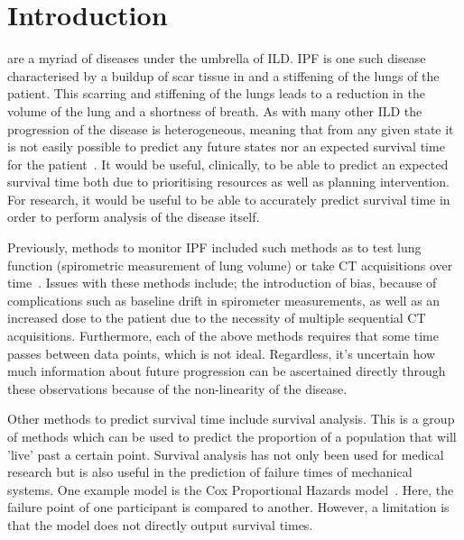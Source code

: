 
\section{Introduction} \label{sec:introduction}
     are a myriad of diseases under the umbrella of \gls{ILD}. \gls{IPF} is one such disease characterised by a buildup of scar tissue in and a stiffening of the lungs of the patient. This scarring and stiffening of the lungs leads to a reduction in the volume of the lung and a shortness of breath. As with many other \gls{ILD} the progression of the disease is heterogeneous, meaning that from any given state it is not easily possible to predict any future states nor an expected survival time for the patient~\cite{King2011IdiopathicFibrosis}. It would be useful, clinically, to be able to predict an expected survival time both due to prioritising resources as well as planning intervention. For research, it would be useful to be able to accurately predict survival time in order to perform analysis of the disease itself.

    Previously, methods to monitor \gls{IPF} included such methods as to test lung function (spirometric measurement of lung volume) or take \gls{CT} acquisitions over time~\cite{Watters1986AFibrosis, Lynch2018DiagnosticPaper}. Issues with these methods include; the introduction of bias, because of complications such as baseline drift in spirometer measurements, as well as an increased dose to the patient due to the necessity of multiple sequential \gls{CT} acquisitions. Furthermore, each of the above methods requires that some time passes between data points, which is not ideal. Regardless, it's uncertain how much information about future progression can be ascertained directly through these observations because of the non-linearity of the disease.

    Other methods to predict survival time include survival analysis. This is a group of methods which can be used to predict the proportion of a population that will 'live' past a certain point. Survival analysis has not only been used for medical research but is also useful in the prediction of failure times of mechanical systems. One example model is the Cox Proportional Hazards model~\cite{Cox1972RegressionLife-Tables}. Here, the failure point of one participant is compared to another. However, a limitation is that the model does not directly output survival times.

